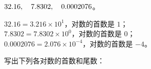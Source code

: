 \hspace*{4em} $32.16,\quad 7.8302,\quad 0.0002076$。

\jie \begin{tblr}[t]{}
    $32.16 = 3.216 \times 10^1$，对数的首数是 $1$；\\
    $7.8302 = 7.8302 \times 10^0$，对数的首数是 $0$；\\
    $0.0002076 = 2.076 \times 10^{-4}$，对数的首数是 $-4$。
\end{tblr}


\liti 写出下列各对数的首数和尾数：

\begin{xiaoxiaotis}

\resetxxt
\jie \begin{tblr}[t]{}
     \\
     \\
\end{tblr}
\end{xiaoxiaotis}


